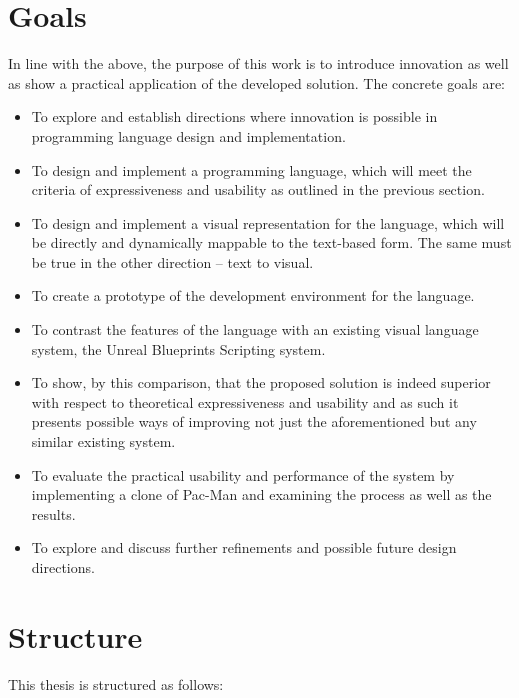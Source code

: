 \section{Goals}
In line with the above, the purpose of this work is to introduce innovation as well as show a practical application of the developed solution. The concrete goals are:
\begin{itemize}
	\item To explore and establish directions where innovation is possible in programming language design and implementation.
	\item To design and implement a programming language, which will meet the criteria of expressiveness and usability as outlined in the previous section.
    \item To design and implement a visual representation for the language, which will be directly and dynamically mappable to the text-based form. The same must be true in the other direction -- text to visual.
	\item To create a prototype of the development environment for the language.
    \item To contrast the features of the language with an existing visual language system, the Unreal Blueprints Scripting system.
    \item To show, by this comparison, that the proposed solution is indeed superior with respect to theoretical expressiveness and usability and as such it presents possible ways of improving not just the aforementioned but any similar existing system. 
	\item To evaluate the practical usability and performance of the system by implementing a clone of Pac-Man and examining the process as well as the results.
	\item To explore and discuss further refinements and possible future design directions.
\end{itemize}

\section{Structure}
This thesis is structured as follows:

